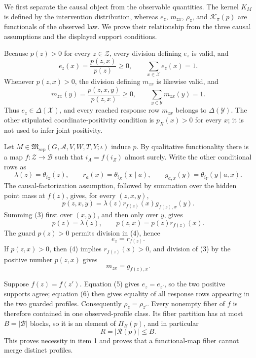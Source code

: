 We first separate the causal object from the observable quantities.  The
kernel \(K_M\) is defined by the intervention distribution, whereas
\(e_z\), \(m_{zx}\), \(\rho_z\), and \(\mathcal K_\pi(p)\) are
functionals of the observed law.  We prove their relationship from the
three causal assumptions and the displayed support conditions.

Because \(p(z)>0\) for every \(z\in\mathcal Z\), every division defining
\(e_z\) is valid, and
\[
 e_z(x)=\frac{p(z,x)}{p(z)}\geq 0,
 \qquad
 \sum_{x\in\mathcal X}e_z(x)=1.
 \tag{1}
\]
Whenever \(p(z,x)>0\), the division defining \(m_{zx}\) is likewise
valid, and
\[
 m_{zx}(y)=\frac{p(z,x,y)}{p(z,x)}\geq 0,
 \qquad
 \sum_{y\in\mathcal Y}m_{zx}(y)=1.
 \tag{2}
\]
Thus \(e_z\in\Delta(\mathcal X)\), and every reached response row
\(m_{zx}\) belongs to \(\Delta(\mathcal Y)\).  The other stipulated
coordinate-positivity condition is \(p_X(x)>0\) for every \(x\); it is
not used to infer joint positivity.

Let \(M\in\mathfrak M_{\mathrm{sep}}(G,\mathcal A,V,W,T,Y;\iota)\)
induce \(p\).  By qualitative functionality there is a map
\(f:\mathcal Z\to\mathcal B\) such that \(i_A=f(i_Z)\) almost surely.
Write the other conditional rows as
\[
 \lambda(z)=\theta_{i_Z}(z),
 \qquad
 r_a(x)=\theta_{i_X}(x\mid a),
 \qquad
 g_{a,x}(y)=\theta_{i_Y}(y\mid a,x).
\]
The causal-factorization assumption, followed by summation over the hidden
point mass at \(f(z)\), gives, for every \((z,x,y)\),
\[
 p(z,x,y)=\lambda(z)r_{f(z)}(x)g_{f(z),x}(y).
 \tag{3}
\]
Summing (3) first over \((x,y)\), and then only over \(y\), gives
\[
 p(z)=\lambda(z),
 \qquad
 p(z,x)=p(z)r_{f(z)}(x).
 \tag{4}
\]
The guard \(p(z)>0\) permits division in (4), hence
\[
 e_z=r_{f(z)}.
 \tag{5}
\]
If \(p(z,x)>0\), then (4) implies \(r_{f(z)}(x)>0\), and division of
(3) by the positive number \(p(z,x)\) gives
\[
 m_{zx}=g_{f(z),x}.
 \tag{6}
\]

Suppose \(f(z)=f(z')\).  Equation (5) gives \(e_z=e_{z'}\), so the two
positive supports agree; equation (6) then gives equality of all response
rows appearing in the two guarded profiles.  Consequently
\(\rho_z=\rho_{z'}\).  Every nonempty fiber of \(f\) is therefore
contained in one observed-profile class.  Its fiber partition has at most
\(B=\lvert\mathcal B\rvert\) blocks, so it is an element of
\(\Pi_B(p)\), and in particular
\[
 R=\lvert\mathcal R(p)\rvert\leq B.
 \tag{7}
\]
This proves necessity in item 1 and proves that a functional-map fiber
cannot merge distinct profiles.

